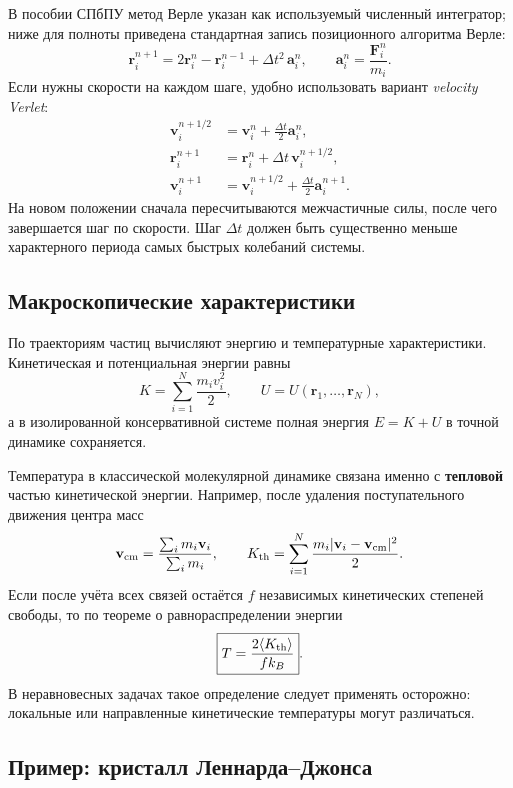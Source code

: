 В пособии СПбПУ метод Верле указан как используемый численный интегратор; ниже для полноты приведена стандартная запись позиционного алгоритма Верле:
\[
    \mathbf r_i^{n+1}
    =2\mathbf r_i^n-\mathbf r_i^{n-1}
     +\Delta t^2\,\mathbf a_i^n,
    \qquad
    \mathbf a_i^n=\frac{\mathbf F_i^n}{m_i}.
\]
Если нужны скорости на каждом шаге, удобно использовать вариант
\emph{velocity Verlet}:
\[
\begin{aligned}
    \mathbf v_i^{n+1/2}&=\mathbf v_i^n
        +\frac{\Delta t}{2}\mathbf a_i^n,\\
    \mathbf r_i^{n+1}&=\mathbf r_i^n
        +\Delta t\,\mathbf v_i^{n+1/2},\\
    \mathbf v_i^{n+1}&=\mathbf v_i^{n+1/2}
        +\frac{\Delta t}{2}\mathbf a_i^{n+1}.
\end{aligned}
\]
На новом положении сначала пересчитываются межчастичные силы, после чего
завершается шаг по скорости. Шаг $\Delta t$ должен быть существенно меньше
характерного периода самых быстрых колебаний системы.

\subsection{Макроскопические характеристики}

По траекториям частиц вычисляют энергию и температурные характеристики.
Кинетическая и потенциальная энергии равны
\[
    K=\sum_{i=1}^{N}\frac{m_i v_i^2}{2},
    \qquad
    U=U(\mathbf r_1,\ldots,\mathbf r_N),
\]
а в изолированной консервативной системе полная энергия
$E=K+U$ в точной динамике сохраняется.

Температура в классической молекулярной динамике связана именно с
\textbf{тепловой} частью кинетической энергии. Например, после удаления
поступательного движения центра масс
\[
    \mathbf v_{\rm cm}=\frac{\sum_i m_i\mathbf v_i}{\sum_i m_i},
    \qquad
    K_{\rm th}=\sum_{i=1}^{N}
    \frac{m_i|\mathbf v_i-\mathbf v_{\rm cm}|^2}{2}.
\]
Если после учёта всех связей остаётся $f$ независимых кинетических степеней
свободы, то по теореме о равнораспределении энергии
\[
    \boxed{T=\frac{2\langle K_{\rm th}\rangle}{f k_B}}.
\]
В неравновесных задачах такое определение следует применять осторожно:
локальные или направленные кинетические температуры могут различаться.

\subsection{Пример: кристалл Леннарда--Джонса}

